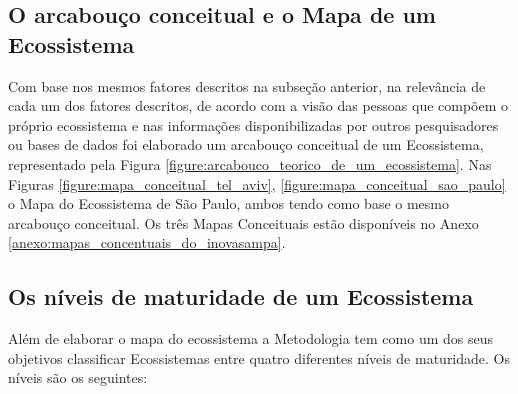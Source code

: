\subsection{O arcabouço conceitual e o Mapa de um Ecossistema}
\label{subsection:arcabouco_conceitual_e_modelo}

Com base nos mesmos fatores descritos na subseção anterior, na relevância de cada um dos fatores descritos, de acordo com a visão das pessoas que compõem o próprio ecossistema e nas informações disponibilizadas por outros pesquisadores ou bases de dados foi elaborado um arcabouço conceitual de um Ecossistema, representado pela Figura \ref{figure:arcabouco_teorico_de_um_ecossistema}. Nas Figuras \ref{figure:mapa_conceitual_tel_aviv}, \ref{figure:mapa_conceitual_sao_paulo} o Mapa do Ecossistema de São Paulo, ambos tendo como base o mesmo arcabouço conceitual. Os três Mapas Conceituais estão disponíveis no Anexo \ref{anexo:mapas_concentuais_do_inovasampa}.

\subsection{Os níveis de maturidade de um Ecossistema}
\label{subsection:niveis_de_maturidade_de_um_ecossistema}

Além de elaborar o mapa do ecossistema a Metodologia tem como um dos seus objetivos classificar Ecossistemas entre quatro diferentes níveis de maturidade. Os níveis são os seguintes:

